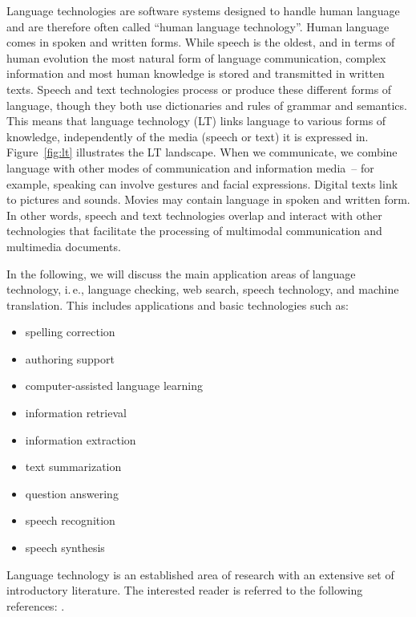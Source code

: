 \begin{multicols}{2}
  Language technologies are software systems designed to handle human language and are therefore often called ``human language technology''.  Human language comes in spoken and written forms.  While speech is the oldest, and in terms of human evolution the most natural form of language communication, complex information and most human knowledge is stored and transmitted in written texts.  Speech and text technologies process or produce these different forms of language, though they both use dictionaries and rules of grammar and semantics.  This means that language technology (LT) links language to various forms of knowledge, independently of the media (speech or text) it is expressed in.  Figure~\ref{fig:lt} illustrates the LT landscape.  When we communicate, we combine language with other modes of communication and information media~-- for example, speaking can involve gestures and facial expressions.  Digital texts link to pictures and sounds.  Movies may contain language in spoken and written form.  In other words, speech and text technologies overlap and interact with other technologies that facilitate the processing of multimodal communication and multimedia documents.

In the following, we will discuss the main application areas of language technology, i.\,e., language checking, web search, speech technology, and machine translation.
This includes applications and basic technologies such as: 

\begin{itemize}
\item  spelling correction
\item  authoring support
\item  computer-assisted language learning
\item  information retrieval 
\item  information extraction
\item  text summarization
\item  question answering
\item  speech recognition 
\item  speech synthesis 
\end{itemize}

Language technology is an established area of research with an extensive set of introductory literature. The interested reader is referred to the following references: \cite{carstensen-etal1, jurafsky-martin01, manning-schuetze1, lt-world1, lt-survey1}.


\end{multicols}

